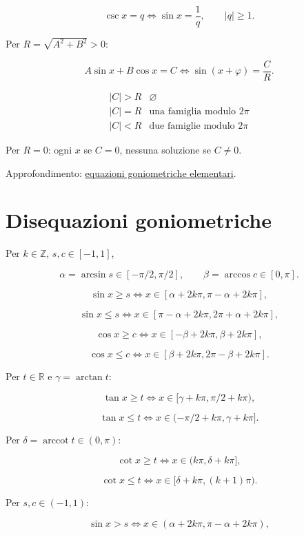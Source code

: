 \[
\csc x=q
\Longleftrightarrow
\sin x=\frac1q,
\qquad |q|\ge1.
\]

Per \(R=\sqrt{A^2+B^2}>0\):

\[
A\sin x+B\cos x=C
\Longleftrightarrow
\sin(x+\varphi)=\frac CR.
\]

\[
\begin{array}{c|c}
|C|>R&\varnothing\\
|C|=R&\text{una famiglia modulo }2\pi\\
|C|<R&\text{due famiglie modulo }2\pi
\end{array}
\]

Per \(R=0\): ogni \(x\) se \(C=0\), nessuna soluzione se \(C\ne0\).

Approfondimento: \href{https://ingegnerismo.it/matematica/equazioni-goniometriche-elementari/}{equazioni goniometriche elementari}.

\section{Disequazioni goniometriche}\label{disequazioni-goniometriche}

Per \(k\in\mathbb Z\), \(s,c\in[-1,1]\),

\[
\alpha=\arcsin s\in[-\pi/2,\pi/2],
\qquad
\beta=\arccos c\in[0,\pi].
\]

\[
\sin x\ge s
\Longleftrightarrow
x\in[\alpha+2k\pi,\pi-\alpha+2k\pi],
\]

\[
\sin x\le s
\Longleftrightarrow
x\in[\pi-\alpha+2k\pi,2\pi+\alpha+2k\pi],
\]

\[
\cos x\ge c
\Longleftrightarrow
x\in[-\beta+2k\pi,\beta+2k\pi],
\]

\[
\cos x\le c
\Longleftrightarrow
x\in[\beta+2k\pi,2\pi-\beta+2k\pi].
\]

Per \(t\in\mathbb R\) e \(\gamma=\arctan t\):

\[
\tan x\ge t
\Longleftrightarrow
x\in[\gamma+k\pi,\pi/2+k\pi),
\]

\[
\tan x\le t
\Longleftrightarrow
x\in(-\pi/2+k\pi,\gamma+k\pi].
\]

Per \(\delta=\operatorname{arccot}t\in(0,\pi)\):

\[
\cot x\ge t
\Longleftrightarrow
x\in(k\pi,\delta+k\pi],
\]

\[
\cot x\le t
\Longleftrightarrow
x\in[\delta+k\pi,(k+1)\pi).
\]

Per \(s,c\in(-1,1)\):

\[
\sin x>s
\Longleftrightarrow
x\in(\alpha+2k\pi,\pi-\alpha+2k\pi),
\]

